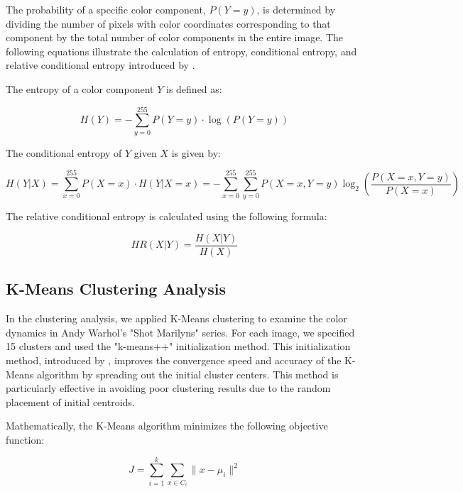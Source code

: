 \documentclass{article}
\begin{document}
The probability of a specific color component, \(P(Y=y)\), is determined
by dividing the number of pixels with color coordinates corresponding to
that component by the total number of color components in the entire
image. The following equations illustrate the calculation of entropy,
conditional entropy, and relative conditional entropy introduced by \citet{shannon_1948_a}.

The entropy of a color component \(Y\) is defined as:

\begin{equation}
  H(Y) = - \sum_{y=0}^{255} P(Y = y) \cdot \log(P(Y = y))
\end{equation}

The conditional entropy of \(Y\) given \(X\) is given by:

\begin{equation}
  H(Y|X) = \sum_{x=0}^{255} P(X = x) \cdot H(Y|X = x) = - \sum_{x=0}^{255} \sum_{y=0}^{255} P(X = x, Y = y) \log_2 \left(\frac{P(X = x, Y = y)}{P(X = x)}\right)
\end{equation}

The relative conditional entropy is calculated using the following
formula:

\begin{equation}
  HR(X|Y) = \frac{H(X|Y)}{H(X)}
\end{equation}

\hypertarget{k-means-clustering-analysis}{%
\subsection{K-Means Clustering
Analysis}\label{k-means-clustering-analysis}}

In the clustering analysis, we applied K-Means clustering to examine the
color dynamics in Andy Warhol's "Shot Marilyns" series. For each
image, we specified 15 clusters and used the "k-means++"
initialization method. This initialization method, introduced by \citet{arthur_2007_kmeans}, improves the convergence speed and accuracy of
the K-Means algorithm by spreading out the initial cluster centers. This
method is particularly effective in avoiding poor clustering results due
to the random placement of initial centroids.

Mathematically, the K-Means algorithm minimizes the following objective
function:

\begin{equation}
  J = \sum_{i=1}^{k} \sum_{x \in C_i} \| x - \mu_i \|^2
\end{equation}
\end{document}
